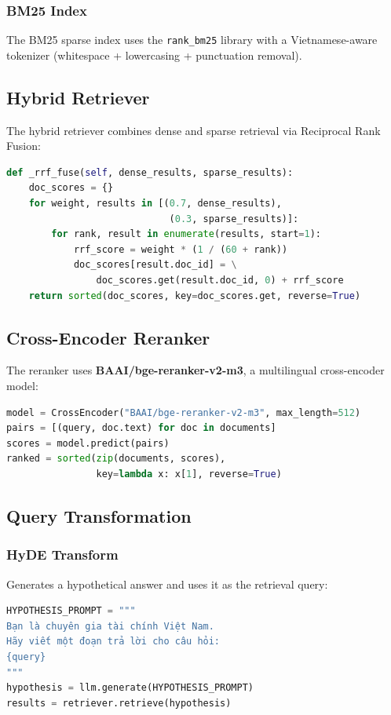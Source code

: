 \documentclass[12pt,a4paper]{article}
\begin{document}
\subsubsection{BM25 Index}

The BM25 sparse index uses the \texttt{rank\_bm25} library with a
Vietnamese-aware tokenizer (whitespace + lowercasing + punctuation removal).

\subsection{Hybrid Retriever}

The hybrid retriever combines dense and sparse retrieval via Reciprocal Rank
Fusion:

\begin{lstlisting}[language=Python, caption={RRF fusion algorithm}]
def _rrf_fuse(self, dense_results, sparse_results):
    doc_scores = {}
    for weight, results in [(0.7, dense_results),
                             (0.3, sparse_results)]:
        for rank, result in enumerate(results, start=1):
            rrf_score = weight * (1 / (60 + rank))
            doc_scores[result.doc_id] = \
                doc_scores.get(result.doc_id, 0) + rrf_score
    return sorted(doc_scores, key=doc_scores.get, reverse=True)
\end{lstlisting}

\subsection{Cross-Encoder Reranker}

The reranker uses \textbf{BAAI/bge-reranker-v2-m3}, a multilingual
cross-encoder model:

\begin{lstlisting}[language=Python, caption={Reranking process}]
model = CrossEncoder("BAAI/bge-reranker-v2-m3", max_length=512)
pairs = [(query, doc.text) for doc in documents]
scores = model.predict(pairs)
ranked = sorted(zip(documents, scores),
                key=lambda x: x[1], reverse=True)
\end{lstlisting}

\subsection{Query Transformation}

\subsubsection{HyDE Transform}
Generates a hypothetical answer and uses it as the retrieval query:
\begin{lstlisting}[language=Python]
HYPOTHESIS_PROMPT = """
Bạn là chuyên gia tài chính Việt Nam.
Hãy viết một đoạn trả lời cho câu hỏi:
{query}
"""
hypothesis = llm.generate(HYPOTHESIS_PROMPT)
results = retriever.retrieve(hypothesis)
\end{lstlisting}
\end{document}
